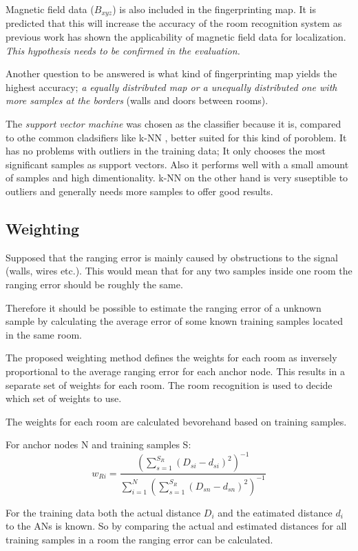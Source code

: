 Magnetic field data ($B_{xyz}$) is also included in the fingerprinting map. It is predicted that this will increase the accuracy of the room recognition system as previous work has shown the applicability of  magnetic field data for localization. \emph{This hypothesis needs to be confirmed in the evaluation.}

Another question to be answered is what kind of fingerprinting map yields the highest accuracy; \emph{a equally distributed map or a unequally distributed one with more samples at the borders }(walls and doors between rooms).

The \emph{support vector machine} was chosen as the classifier because it is, compared to othe common cladsifiers like k-NN , better suited for this kind of poroblem. It has no problems with outliers in the training data; It only chooses the most significant samples as support vectors. Also it performs well with a small amount of samples and high dimentionality. k-NN on the other hand is very suseptible to outliers and generally needs more samples to offer good results.

\subsection{Weighting}

Supposed that the ranging error is mainly caused by obstructions to the signal (walls, wires etc.). This would mean that for any two samples inside one room the ranging error should be roughly the same.

Therefore it should be possible to estimate the ranging error of a unknown sample by calculating the average error of some known training samples located in the same room.

The proposed weighting method defines the weights for each room as inversely proportional to the average ranging error for each anchor node. This results in a separate set of weights for each room. The room recognition is used to decide which set of weights to use.

The weights for each room are calculated bevorehand based on training samples.

For anchor nodes N and training samples S:
\begin{equation}
w_{Ri}=\frac{(\sum_{s=1}^{S_R}{(D_{si}-d_{si})^2})^{-1}}{\sum_{i=1}^{N}{(\sum_{s=1}^{S_R}{(D_{sn}-d_{sn})^2})^{-1}}}
\end{equation}



For the training data both the actual distance $D_i$ and the eatimated distance $d_i$ to the ANs is known. So by comparing the actual and estimated distances for all training samples in a room the ranging error can be calculated.

